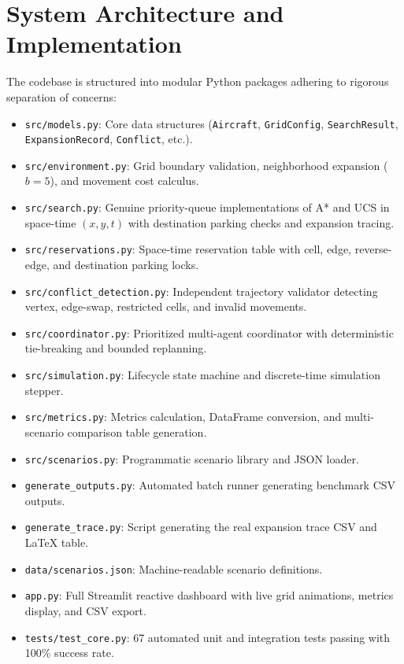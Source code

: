\documentclass[11pt,a4paper]{article}
\begin{document}
\section{System Architecture and Implementation}
The codebase is structured into modular Python packages adhering to rigorous separation of concerns:
\begin{itemize}
    \item \texttt{src/models.py}: Core data structures (\texttt{Aircraft}, \texttt{GridConfig}, \texttt{SearchResult}, \texttt{ExpansionRecord}, \texttt{Conflict}, etc.).
    \item \texttt{src/environment.py}: Grid boundary validation, neighborhood expansion ($b=5$), and movement cost calculus.
    \item \texttt{src/search.py}: Genuine priority-queue implementations of A* and UCS in space-time $(x, y, t)$ with destination parking checks and expansion tracing.
    \item \texttt{src/reservations.py}: Space-time reservation table with cell, edge, reverse-edge, and destination parking locks.
    \item \texttt{src/conflict\_detection.py}: Independent trajectory validator detecting vertex, edge-swap, restricted cells, and invalid movements.
    \item \texttt{src/coordinator.py}: Prioritized multi-agent coordinator with deterministic tie-breaking and bounded replanning.
    \item \texttt{src/simulation.py}: Lifecycle state machine and discrete-time simulation stepper.
    \item \texttt{src/metrics.py}: Metrics calculation, DataFrame conversion, and multi-scenario comparison table generation.
    \item \texttt{src/scenarios.py}: Programmatic scenario library and JSON loader.
    \item \texttt{generate\_outputs.py}: Automated batch runner generating benchmark CSV outputs.
    \item \texttt{generate\_trace.py}: Script generating the real expansion trace CSV and LaTeX table.
    \item \texttt{data/scenarios.json}: Machine-readable scenario definitions.
    \item \texttt{app.py}: Full Streamlit reactive dashboard with live grid animations, metrics display, and CSV export.
    \item \texttt{tests/test\_core.py}: 67 automated unit and integration tests passing with 100\% success rate.
\end{itemize}
\end{document}
